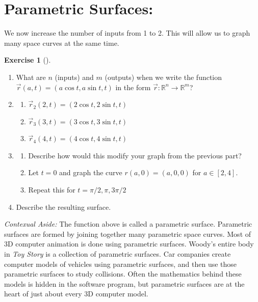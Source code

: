 \documentclass[10pt,]{book}
\theoremstyle{plain}
\theoremstyle{definition}
\theoremstyle{definition}
\theoremstyle{definition}
\theoremstyle{definition}
\newtheorem{exploration}[project]{Exercise}
\theoremstyle{definition}
\numberwithin{equation}{section}
\begin{document}
\section[{Parametric Surfaces:}]{Parametric Surfaces:}\label{section-17}
We now increase the number of inputs from 1 to 2. This will allow us to graph many space curves at the same time.%
\begin{exploration}[]\label{prob_parametric_surface_example}
\leavevmode%
\begin{enumerate}[font=\bfseries,label=(\alph*),ref=\alph*]
\item\label{task-183} What are \(n\) (inputs) and \(m\) (outputs) when we write the function \(\vec r(a,t)=(a\cos t, a\sin t, t)\) in the form  \(\vec r\colon {\mathbb{R}}^n\to {\mathbb{R}}^m\)?%
\item\label{task-184} \begin{enumerate}[font=\bfseries,label=(\roman*),ref=\theenumi.\roman*]
\item\label{task-185} \(\vec r_2(2,t)=(2\cos t, 2\sin t, t)\)%
\item\label{task-186} \(\vec r_3(3,t)=(3\cos t, 3\sin t, t)\)%
\item\label{task-187} \(\vec r_4(4,t)=(4\cos t, 4\sin t, t)\)%
\end{enumerate}
\item\label{task-188} \begin{enumerate}[font=\bfseries,label=(\roman*),ref=\theenumi.\roman*]
\item\label{task-189} Describe how would this modify your graph from the previous part?%
\item\label{task-190} Let \(t=0\) and graph the curve \(r(a,0)=(a,0,0)\) for \(a\in[2,4]\).%
\item\label{task-191} Repeat this for \(t=\pi/2,\pi,3\pi/2\)%
\end{enumerate}
\item\label{task-192} Describe the resulting surface.%
\end{enumerate}
\end{exploration}
\emph{Contexual Aside:} The function above is called a parametric surface. Parametric surfaces are formed by joining together many parametric space curves. Most of 3D computer animation is done using parametric surfaces. Woody's entire body in \emph{Toy Story} is a collection of parametric surfaces. Car companies create computer models of vehicles using parametric surfaces, and then use those parametric surfaces to study collisions. Often the mathematics behind these models is hidden in the software program, but parametric surfaces are at the heart of just about every 3D computer model.%
\end{document}
